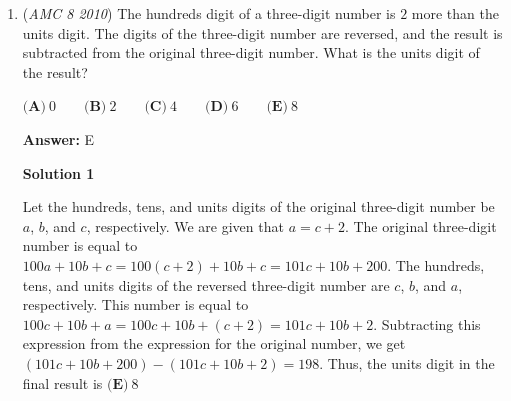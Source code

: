 \begin{enumerate}
\textbf{Solution 1(algebra solution)}

Let $x$ be the number of pages in the book. After the first day, Hui had $\frac{4x}{5}-12$ pages left to read. After the second, she had $\left(\frac{3}{4}\right)\left(\frac{4x}{5}-12\right)-15 = \frac{3x}{5}-24$ left. After the third, she had $\left(\frac{2}{3}\right)\left(\frac{3x}{5}-24\right)-18=\frac{2x}{5}-34$ left. This is equivalent to $62.$

 \begin{align*} \frac{2x}{5}-34&=62\\ 2x - 170 &= 310\\ 2x &= 480\\ x &= \boxed{\textbf{(C)}\ 240} \end{align*}





\textbf{Solution 2 (working backwards)}

On the last day, Hui read $62$ pages. Working backwards, she read $18$ pages more ($80$ total). $80$ is $\frac{2}{3}$ of the remaining pages, so the third morning Hui had $120$ pages to read. Add back the $15$ and you find $135$ must be $\frac{3}{4}$ of the remaining pages, so there were $180$ pages on the second morning.  Add $12$ more, then $192$ is $\frac{4}{5}$ of the total book, which must be $\boxed{\textbf{(C)}\ 240}$ pages long.

 


 


	\item (\textit{AMC 8 2010}) The hundreds digit of a three-digit number is $2$ more than the units digit. The digits of the three-digit number are reversed, and the result is subtracted from the original three-digit number. What is the units digit of the result?


 $\textbf{(A)}\ 0 \qquad\textbf{(B)}\ 2\qquad\textbf{(C)}\ 4\qquad\textbf{(D)}\ 6\qquad\textbf{(E)}\ 8$

 \textbf{Answer: }E



\textbf{Solution 1}

Let the hundreds, tens, and units digits of the original three-digit number be $a$, $b$, and $c$, respectively. We are given that $a=c+2$. The original three-digit number is equal to $100a+10b+c = 100(c+2)+10b+c = 101c+10b+200$. The hundreds, tens, and units digits of the reversed three-digit number are $c$, $b$, and $a$, respectively. This number is equal to $100c+10b+a = 100c+10b+(c+2) = 101c+10b+2$. Subtracting this expression from the expression for the original number, we get $(101c+10b+200) - (101c+10b+2) = 198$. Thus, the units digit in the final result is $\boxed{\textbf{(E)}\ 8}$





\end{enumerate}
